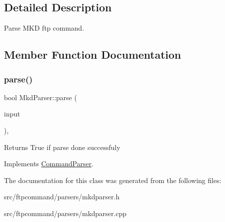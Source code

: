 \subsection{Detailed Description}
Parse M\+KD ftp command. 

\subsection{Member Function Documentation}
\mbox{\label{classMkdParser_ad886e57eeff70f08b2e057879fb0d9df}} 
\subsubsection{\texorpdfstring{parse()}{parse()}}
{\footnotesize\ttfamily bool Mkd\+Parser\+::parse (\begin{DoxyParamCaption}\item[{const Q\+String \&}]{input }\end{DoxyParamCaption})\hspace{0.3cm}{\ttfamily [override]}, {\ttfamily [virtual]}}

\begin{DoxyReturn}{Returns}
True if parse done successfuly 
\end{DoxyReturn}


Implements \hyperlink{classCommandParser_a5ed0855947a9b4500329f29b8123f2ea}{Command\+Parser}.



The documentation for this class was generated from the following files\+:\begin{DoxyCompactItemize}
\item 
src/ftpcommand/parsers/mkdparser.\+h\item 
src/ftpcommand/parsers/mkdparser.\+cpp\end{DoxyCompactItemize}
